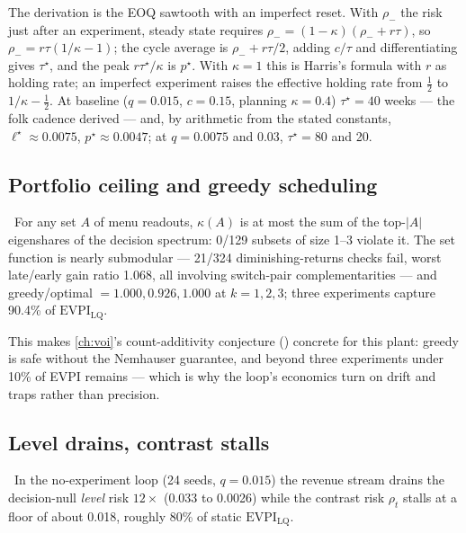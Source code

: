 The derivation is the EOQ sawtooth with an imperfect reset. With $\rho_-$ the risk just after an experiment, steady state requires $\rho_- = (1-\kappa)(\rho_- + r\tau)$, so $\rho_- = r\tau(1/\kappa - 1)$; the cycle average is $\rho_- + r\tau/2$, adding $c/\tau$ and differentiating gives $\tau^\star$, and the peak $r\tau^\star/\kappa$ is $p^\star$. With $\kappa = 1$ this is Harris's formula with $r$ as holding rate; an imperfect experiment raises the effective holding rate from $\tfrac12$ to $1/\kappa - \tfrac12$. At baseline ($q = 0.015$, $c = 0.15$, planning $\kappa = 0.4$) $\tau^\star = 40$ weeks --- the folk cadence derived --- and, by arithmetic from the stated constants, $\ell^\star \approx 0.0075$, $p^\star \approx 0.0047$; at $q = 0.0075$ and $0.03$, $\tau^\star = 80$ and 20.

\subsection{Portfolio ceiling and greedy scheduling}

\begin{proposition}
\label{fusion:prop:portfolio}
\tagNumerical\ For any set $A$ of menu readouts, $\kappa(A)$ is at most the sum of the top-$|A|$ eigenshares of the decision spectrum: 0/129 subsets of size 1--3 violate it. The set function is nearly submodular --- 21/324 diminishing-returns checks fail, worst late/early gain ratio 1.068, all involving switch-pair complementarities --- and greedy/optimal $= 1.000, 0.926, 1.000$ at $k = 1,2,3$; three experiments capture 90.4\% of $\mathrm{EVPI}_{\mathrm{LQ}}$.
\end{proposition}

This makes \cref{ch:voi}'s count-additivity conjecture () concrete for this plant: greedy is safe without the Nemhauser guarantee, and beyond three experiments under 10\% of EVPI remains --- which is why the loop's economics turn on drift and traps rather than precision.

\subsection{Level drains, contrast stalls}

\begin{proposition}
\label{fusion:prop:split}
\tagNumerical\ In the no-experiment loop (24 seeds, $q = 0.015$) the revenue stream drains the decision-null \emph{level} risk $12\times$ (0.033 to 0.0026) while the contrast risk $\rho_t$ stalls at a floor of about 0.018, roughly 80\% of static $\mathrm{EVPI}_{\mathrm{LQ}}$.
\end{proposition}

